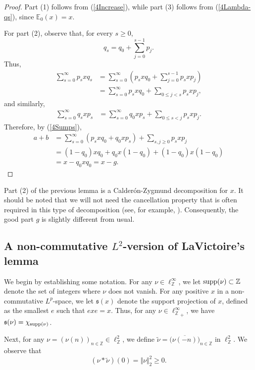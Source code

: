 \documentclass[12pt]{amsart}
\newcommand{\Edb}{\mbox{$\mathbb{E}$}}
\newcommand{\Zdb}{\mbox{$\mathbb{Z}$}}
\newcommand{\norm}[1]{\Vert#1\Vert}
\theoremstyle{remark}
\theoremstyle{definition}
\numberwithin{equation}{section}
\begin{document}
\begin{proof}
Part (1) follows from (\ref{4Increase}), while part (3) follows from
(\ref{4Lambda-qs}), since $\Edb_0(x)=x$.

For part (2), observe that, for every $s\geq0$,
$$
q_s=q_0+\sum_{j=0}^{s-1}p_j.
$$
Thus,
\begin{align*}
\sum_{s=0}^{\infty}p_sxq_s
&=
\sum_{s=0}^{\infty}
\left(p_sxq_0+\sum_{j=0}^{s-1}p_sxp_j\right)\\
&=
\sum_{s=0}^{\infty}p_sxq_0
+
\sum_{0\leq j<s}p_sxp_j,
\end{align*}
and similarly,
\begin{align*}
\sum_{s=0}^{\infty}q_sxp_s
&=
\sum_{s=0}^{\infty}q_0xp_s
+
\sum_{0\leq s<j}p_sxp_j.
\end{align*}
Therefore, by (\ref{4Sumps}),
\begin{align*}
a+b
&=
\sum_{s=0}^{\infty}(p_sxq_0+q_0xp_s)
+
\sum_{s,j\geq0}p_sxp_j\\
&=
(1-q_0)xq_0
+
q_0x(1-q_0)
+
(1-q_0)x(1-q_0)\\
&=x-q_0xq_0=x-g.
\end{align*}
\end{proof}

Part (2) of the previous lemma is a Calderón-Zygmund decomposition for $x$. It should be noted that we will not need the cancellation property that is often required in this type of decomposition (see, for example, \cite{CCAP, P}). Consequently, the good part $g$ is slightly different from usual.




\subsection{A non-commutative $L^2$-version of LaVictoire's lemma}\label{LaVictoire}

We begin by establishing some notation.
For any $\nu\in\ell^\infty_{\mathbb Z}$, we let
${\rm supp}(\nu)\subset\Zdb$ denote the set of integers where
$\nu$ does not vanish. For any positive $x$ in a non-commutative
$L^p$-space, we let ${\mathfrak s}(x)$ denote the support projection
of $x$, defined as the smallest $e$ such that $exe=x$.
Thus, for any
$\nu\in{\ell^\infty_{\mathbb Z}}_+$, we have
${\mathfrak s}(\nu) = \chi_{{\rm supp}(\nu)}$.

Next, for any $\nu = (\nu(n))_{n\in\mathbb Z}\in\ell^2_{\mathbb Z}$, we define
$\widetilde{\nu} = \bigl(\overline{\nu(-n)}\bigr)_{n\in\mathbb Z}$
in $\ell^2_{\mathbb Z}$. We observe that
$$
(\nu * \widetilde{\nu})(0)= \norm{\nu}_2^2\geq 0.
$$
\end{document}
